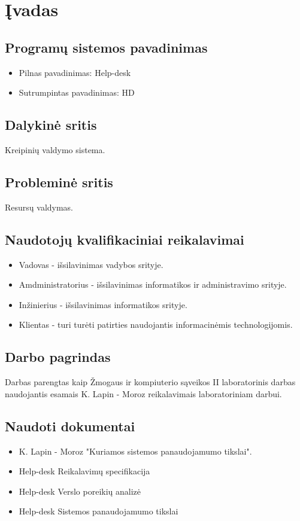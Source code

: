 \section{Įvadas}
	
	\subsection{Programų sistemos pavadinimas}
	
	\begin{itemize}
	\item Pilnas pavadinimas: Help-desk
	\item Sutrumpintas pavadinimas: HD
	\end{itemize}
	
	\subsection{Dalykinė sritis}
	
	Kreipinių valdymo sistema.
	
	\subsection{Probleminė sritis}
	
	Resursų valdymas.
	
	\subsection{Naudotojų kvalifikaciniai reikalavimai}
	
	\begin{itemize}
	\item Vadovas - išsilavinimas vadybos srityje.
	\item Amdministratorius - išsilavinimas informatikos ir administravimo srityje.
	\item Inžinierius - išsilavinimas informatikos srityje.
	\item Klientas - turi turėti patirties naudojantis informacinėmis technologijomis.
	\end{itemize}
	
	\subsection{Darbo pagrindas}
	
	Darbas parengtas kaip Žmogaus ir kompiuterio sąveikos II laboratorinis darbas naudojantis esamais K. Lapin - Moroz reikalavimais laboratoriniam darbui.
	
	\subsection{Naudoti dokumentai}
	
	\begin{itemize}
	\item K. Lapin - Moroz "Kuriamos sistemos panaudojamumo tikslai".
	\item Help-desk Reikalavimų specifikacija
	\item Help-desk Verslo poreikių analizė
	\item Help-desk Sistemos panaudojamumo tikslai
	\end{itemize}
	